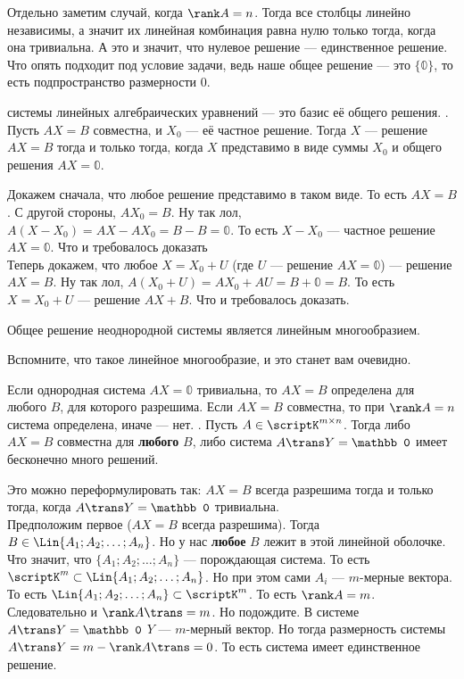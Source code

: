 \documentclass{article}
\begin{document}
\begin{itemize}
\begin{Proof}
            Отдельно заметим случай, когда $\rank A=n$. Тогда все столбцы линейно независимы, а значит их линейная комбинация равна нулю только тогда, когда она тривиальна. А это и значит, что нулевое решение --- единственное решение. Что опять подходит под условие задачи, ведь наше общее решение --- это $\{\mathbb0\}$, то есть подпространство размерности 0.
        \end{Proof}
        \dfn {} системы линейных алгебраических уравнений --- это базис её общего решения.
        \thm {}. Пусть $AX=B$ совместна, и $X_0$ --- её частное решение. Тогда $X$ --- решение $AX=B$ тогда и только тогда, когда $X$ представимо в виде суммы $X_0$ и общего решения $AX=\mathbb0$.
        \begin{Proof}
            Докажем сначала, что любое решение представимо в таком виде. То есть $AX=B$. С другой стороны, $AX_0=B$. Ну так лол, $A(X-X_0)=AX-AX_0=B-B=\mathbb0$. То есть $X-X_0$ --- частное решение $AX=\mathbb0$. Что и требовалось доказать\\
            Теперь докажем, что любое $X=X_0+U$ (где $U$ --- решение $AX=\mathbb0$) --- решение $AX=B$. Ну так лол, $A(X_0+U)=AX_0+AU=B+\mathbb0=B$. То есть $X=X_0+U$ --- решение $AX+B$. Что и требовалось доказать.
        \end{Proof}
        \thm Общее решение неоднородной системы является линейным многообразием.
        \begin{Proof}
            Вспомните, что такое линейное многообразие, и это станет вам очевидно.
        \end{Proof}
        \thm Если однородная система $AX=\mathbb0$ тривиальна, то $AX=B$ определена для любого $B$, для которого разрешима.
        \thm Если $AX=B$ совместна, то при $\rank A=n$ система определена, иначе --- нет.
        \thm {}. Пусть $A\in\scriptK^{m\times n}$. Тогда либо $AX=B$ совместна для \textbf{любого} $B$, либо система $A\trans Y=\mathbb0$ имеет бесконечно много решений.
        \begin{Proof}
            Это можно переформулировать так: $AX=B$ всегда разрешима тогда и только тогда, когда $A\trans Y=\mathbb0$ тривиальна.\\
            Предположим первое ($AX=B$ всегда разрешима). Тогда $B\in\Lin\{A_1;A_2;\ldots;A_n\}$. Но у нас \textbf{любое} $B$ лежит в этой линейной оболочке. Что значит, что $\{A_1;A_2;\ldots;A_n\}$ --- порождающая система. То есть $\scriptK^m\subset\Lin\{A_1;A_2;\ldots;A_n\}$. Но при этом сами $A_i$ --- $m$-мерные вектора. То есть $\Lin\{A_1;A_2;\ldots;A_n\}\subset\scriptK^m$. То есть $\rank A=m$. Следовательно и $\rank A\trans=m$. Но подождите. В системе $A\trans Y=\mathbb0$ $Y$ --- $m$-мерный вектор. Но тогда размерность системы $A\trans Y=m-\rank A\trans=0$. То есть система имеет единственное решение.\\

\end{Proof}
\end{itemize}
\end{document}
